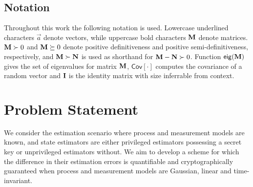 \documentclass[letterpaper, 10 pt, conference]{IEEEtran}
\theoremstyle{definition}
\theoremstyle{definition}
\theoremstyle{remark}
\begin{document}
% 
% 

\subsection{Notation}
Throughout this work the following notation is used. Lowercase underlined characters $\vec{a}$ denote vectors, while uppercase bold characters ${{\mathbf{M}}}$ denote matrices. ${{\mathbf{M}}}\succ 0$ and ${{\mathbf{M}}} \succeq 0$ denote positive definitiveness and positive semi-definitiveness, respectively, and ${{\mathbf{M}}} \succ {\ensuremath{{\mathbf{N}}}}$ is used as shorthand for ${{\mathbf{M}}}-{{\mathbf{N}}}\succ 0$. Function $\mathsf{eig}({{\mathbf{M}}})$ gives the set of eigenvalues for matrix ${{\mathbf{M}}}$, $\mathsf{Cov}[\cdot]$ computes the covariance of a random vector and ${{\mathbf{I}}}$ is the identity matrix with size inferrable from context.

% 
%                                              
%                                              
%                                              
% 

\section{Problem Statement}\label{sec:problem_statement}
We consider the estimation scenario where process and measurement models are known, and state estimators are either privileged estimators possessing a secret key or unprivileged estimators without. We aim to develop a scheme for which the difference in their estimation errors is quantifiable and cryptographically guaranteed when process and measurement models are Gaussian, linear and time-invariant.
\end{document}
